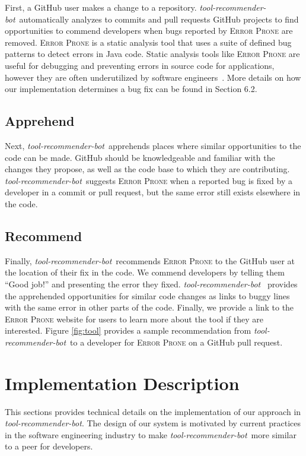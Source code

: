 \documentclass[sigconf,review,anonymous]{acmart}
\newcommand{\tool}{\textsl{tool-recommender-bot}}
\begin{document}
First, a GitHub user makes a change to a repository. \tool~automatically analyzes to commits and pull requests GitHub projects to find opportunities to commend developers when bugs reported by \textsc{Error Prone} are removed. \textsc{Error Prone} is a static analysis tool that uses a suite of defined bug patterns to detect errors in Java code. Static analysis tools like \textsc{Error Prone} are useful for debugging and preventing errors in source code for applications, however they are often underutilized by software engineers~\cite{Johnson2013Why}. More details on how our implementation determines a bug fix can be found in Section 6.2.

\subsection{Apprehend}

Next, \tool~apprehends places where similar opportunities to the code can be made. GitHub should be knowledgeable and familiar with the changes they propose, as well as the code base to which they are contributing. \tool~suggests \textsc{Error Prone} when a reported bug is fixed by a developer in a commit or pull request, but the same error still exists elsewhere in the code. 

\subsection{Recommend}

Finally, \tool~recommends \textsc{Error Prone} to the GitHub user at the location of their fix in the code. We commend developers by telling them ``Good job!'' and presenting the error they fixed. \tool~ provides the apprehended opportunities for similar code changes as links to buggy lines with the same error in other parts of the code. Finally, we provide a link to the \textsc{Error Prone} website for users to learn more about the tool if they are interested. Figure \ref{fig:tool} provides a sample recommendation from \tool~to a developer for \textsc{Error Prone} on a GitHub pull request.

\section{Implementation Description}

This sections provides technical details on the implementation of our approach in \tool. The design of our system is motivated by current practices in the software engineering industry to make \tool~more similar to a peer for developers.
\end{document}
